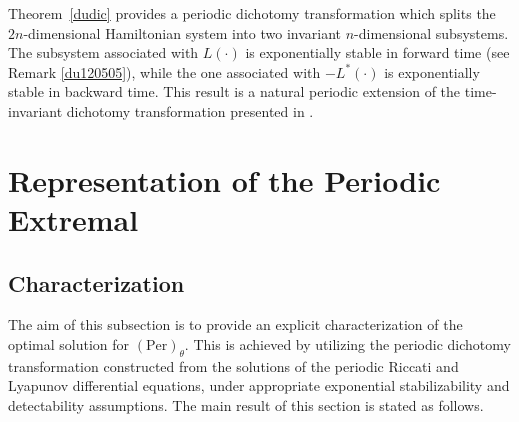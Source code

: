 \documentclass{IEEEtran}
\begin{document}
	\begin{remark}
		Theorem~\ref{dudic} provides a periodic dichotomy transformation which splits the $2n$-dimensional Hamiltonian system into two invariant $n$-dimensional subsystems. The subsystem associated with $L(\cdot)$ is exponentially stable in forward time (see Remark \ref{du120505}), while the one associated with $-L^*(\cdot)$ is exponentially stable in backward time. This result is a natural periodic extension of the time-invariant dichotomy transformation presented in \cite[Lemma 1]{TZZ}.
	\end{remark}
	
	\section{Representation of the Periodic Extremal}\label{Apl}
	
	\subsection{Characterization}
	
	The aim of this subsection is to provide an explicit characterization of the optimal solution for $(\text{Per})_\theta$. This is achieved by utilizing the periodic dichotomy transformation constructed from the solutions of the periodic Riccati and Lyapunov differential equations, under appropriate exponential stabilizability and detectability assumptions. The main result of this section is stated as follows.
	
\end{document}
